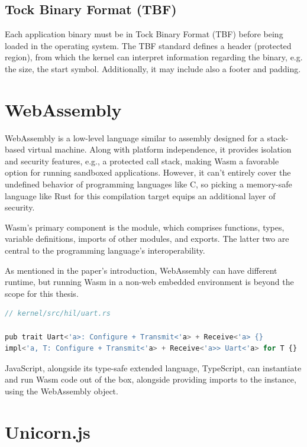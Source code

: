 \documentclass[12pt,a4paper]{report}
\begin{document}
\subsection{Tock Binary Format (TBF)}

Each application binary must be in Tock Binary Format (TBF) before being loaded in the operating system. The TBF standard defines a header (protected region), from which the kernel can interpret information regarding the binary, e.g. the size, the start symbol. Additionally, it may include also a footer and padding. 

\newpage
\section{WebAssembly}

WebAssembly is a low-level language similar to assembly designed for a stack-based virtual machine. Along with platform independence, it provides isolation and security features, e.g., a protected call stack, making Wasm a favorable option for running sandboxed applications. However, it can't entirely cover the undefined behavior of programming languages like C, so picking a memory-safe language like Rust for this compilation target equips an additional layer of security.

Wasm's primary component is the module, which comprises functions, types, variable definitions, imports of other modules, and exports. The latter two are central to the programming language's interoperability.

As mentioned in the paper's introduction, WebAssembly can have different runtime, but running Wasm in a non-web embedded environment is beyond the scope for this thesis.

\begin{lstlisting}[caption={WebAssembly instantiation in JavaScript},label={lst:wasm-inst},language=JavaScript]
// kernel/src/hil/uart.rs

pub trait Uart<'a>: Configure + Transmit<'a> + Receive<'a> {}
impl<'a, T: Configure + Transmit<'a> + Receive<'a>> Uart<'a> for T {}
\end{lstlisting}

JavaScript, alongside its type-safe extended language, TypeScript, can instantiate and run Wasm code out of the box, alongside providing imports to the instance, using the WebAssembly object.  

\section{Unicorn.js}
\end{document}
